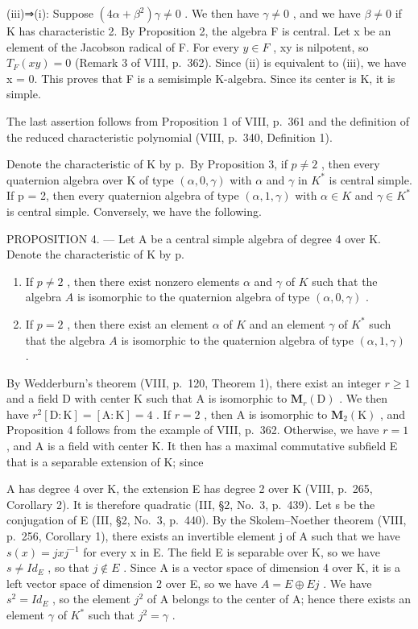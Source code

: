 (iii)⇒(i): Suppose \((4\alpha + \beta^{2})\gamma \neq 0\) . We then have \(\gamma \neq 0\) , and we have \(\beta \neq 0\) if K has characteristic 2. By Proposition 2, the algebra F is central. Let x be an element of the Jacobson radical of F. For every \(y \in F\) , xy is nilpotent, so \(T_{F}(xy) = 0\) (Remark 3 of VIII, p.~362). Since (ii) is equivalent to (iii), we have x = 0. This proves that F is a semisimple K-algebra. Since its center is K, it is simple.

The last assertion follows from Proposition 1 of VIII, p.~361 and the definition of the reduced characteristic polynomial (VIII, p.~340, Definition 1).

Denote the characteristic of K by p.~By Proposition 3, if \(p \neq 2\) , then every quaternion algebra over K of type \((\alpha, 0, \gamma)\) with \(\alpha\) and \(\gamma\) in \(K^{*}\) is central simple. If p = 2, then every quaternion algebra of type \((\alpha, 1, \gamma)\) with \(\alpha \in K\) and \(\gamma \in K^{*}\) is central simple. Conversely, we have the following.

PROPOSITION 4. --- Let A be a central simple algebra of degree 4 over K. Denote the characteristic of K by p.

\begin{enumerate}
\def\labelenumi{\alph{enumi})}
\item
  If \(p \neq 2\) , then there exist nonzero elements \(\alpha\) and \(\gamma\) of \(K\) such that the algebra \(A\) is isomorphic to the quaternion algebra of type \((\alpha, 0, \gamma)\) .
\item
  If \(p = 2\) , then there exist an element \(\alpha\) of \(K\) and an element \(\gamma\) of \(K^*\) such that the algebra \(A\) is isomorphic to the quaternion algebra of type \((\alpha, 1, \gamma)\) .
\end{enumerate}

By Wedderburn's theorem (VIII, p.~120, Theorem 1), there exist an integer \(r \geqslant 1\) and a field D with center K such that A is isomorphic to \(\mathbf{M}_r(\mathrm{D})\) . We then have \(r^2[\mathrm{D}:\mathrm{K}] = [\mathrm{A}:\mathrm{K}] = 4\) . If \(r = 2\) , then A is isomorphic to \(\mathbf{M}_2(\mathrm{K})\) , and Proposition 4 follows from the example of VIII, p.~362. Otherwise, we have \(r = 1\) , and A is a field with center K. It then has a maximal commutative subfield E that is a separable extension of K; since

A has degree 4 over K, the extension E has degree 2 over K (VIII, p.~265, Corollary 2). It is therefore quadratic (III, §2, No.~3, p.~439). Let s be the conjugation of E (III, §2, No.~3, p.~440). By the Skolem--Noether theorem (VIII, p.~256, Corollary 1), there exists an invertible element j of A such that we have \(s(x) = jxj^{-1}\) for every x in E. The field E is separable over K, so we have \(s \neq Id_{E}\) , so that \(j \notin E\) . Since A is a vector space of dimension 4 over K, it is a left vector space of dimension 2 over E, so we have \(A = E \oplus Ej\) . We have \(s^{2} = Id_{E}\) , so the element \(j^{2}\) of A belongs to the center of A; hence there exists an element \(\gamma\) of \(K^{*}\) such that \(j^{2} = \gamma\) .

